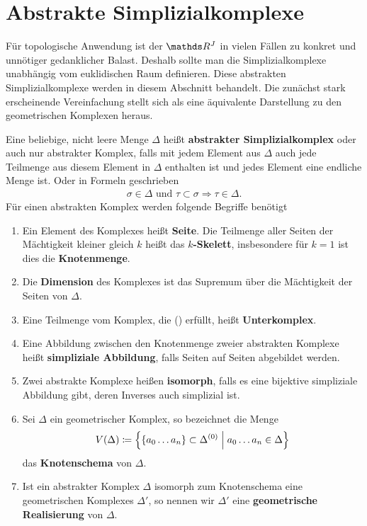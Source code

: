
\section{Abstrakte Simplizialkomplexe}

Für topologische Anwendung ist der $\R^J$ in vielen Fällen zu konkret
und unnötiger gedanklicher Balast. Deshalb sollte man die
Simplizialkomplexe unabhängig vom euklidischen Raum definieren. Diese
abstrakten Simplizialkomplexe werden in diesem Abschnitt
behandelt. Die zunächst stark erscheinende Vereinfachung stellt sich
als eine äquivalente Darstellung zu den geometrischen Komplexen
heraus.

\begin{Def}
  Eine beliebige, nicht leere Menge $\Delta$ heißt \textbf{abstrakter
    Simplizialkomplex} oder auch nur abstrakter Komplex, falls mit
  jedem Element aus $\Delta$ auch jede Teilmenge aus diesem Element in
  $\Delta$ enthalten ist und jedes Element eine endliche
  Menge ist. Oder in Formeln geschrieben
\renewcommand*{\theequation}{\textbullet}
  \begin{gather}
    \sigma \in \Delta \text{ und }  \tau \subset \sigma
    \Rightarrow \tau \in \Delta.
  \end{gather}
  Für einen abstrakten Komplex werden folgende Begriffe benötigt
  \begin{enumerate}[({A}1)]
  \item Ein Element des Komplexes heißt \textbf{Seite}. Die Teilmenge aller
    Seiten der Mächtigkeit kleiner gleich $k$ heißt das \textbf{$k$-Skelett},
    insbesondere für $k=1$ ist dies die \textbf{Knotenmenge}.
  \item Die \textbf{Dimension} des Komplexes ist das Supremum über die
    Mächtigkeit der Seiten von $\Delta$.
  \item Eine Teilmenge vom Komplex, die (\textbullet) erfüllt, heißt
    \textbf{Unterkomplex}.
  \item Eine Abbildung zwischen den Knotenmenge zweier abstrakten
    Komplexe heißt \textbf{simpliziale Abbildung}, falls Seiten auf
    Seiten abgebildet werden.
  \item Zwei abstrakte Komplexe heißen \textbf{isomorph}, falls es eine
    bijektive simpliziale Abbildung gibt, deren Inverses auch
    simplizial ist.
  \item Sei $\Delta$ ein geometrischer Komplex, so bezeichnet die Menge
    \begin{gather*}
      V(\Delta) \coloneqq \left\{  \left\{ a_0 \ldots a_n \right\} \subset
        \Delta^{(0)}  \; \Big| \;  a_0 \ldots a_n \in \Delta \right\}
    \end{gather*}
    das \textbf{Knotenschema} von $\Delta$.
  \item Ist ein abstrakter Komplex $\Delta$ isomorph zum Knotenschema
    eine geometrischen Komplexes $\Delta'$, so nennen wir $\Delta'$
    eine \textbf{geometrische Realisierung} von $\Delta$.
  \end{enumerate}
\end{Def}

